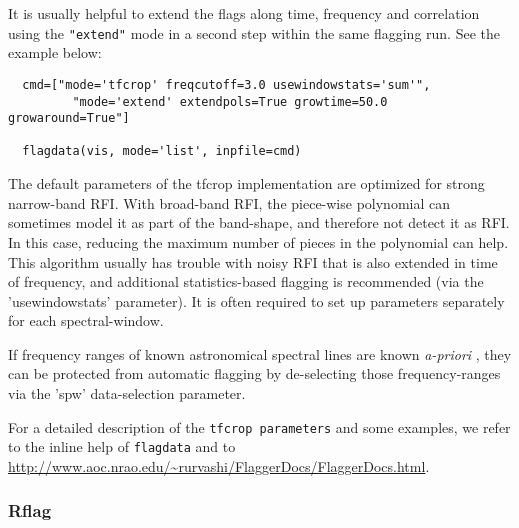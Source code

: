 It is usually helpful to extend the flags along time, frequency and
correlation using the {\tt "extend"}
mode in a second step within the same flagging run. See the example
below:

\small
\begin{verbatim}
  cmd=["mode='tfcrop' freqcutoff=3.0 usewindowstats='sum'", 
         "mode='extend' extendpols=True growtime=50.0 growaround=True"]
                     
  flagdata(vis, mode='list', inpfile=cmd)     
\end{verbatim}
\normalsize


The default parameters of the tfcrop implementation are optimized for
strong narrow-band RFI. With broad-band RFI, the piece-wise polynomial
can sometimes model it as part of the band-shape, and therefore not
detect it as RFI. In this case, reducing the maximum number of pieces
in the polynomial can help. This algorithm usually has trouble with
noisy RFI that is also extended in time of frequency, and additional
statistics-based flagging is recommended (via the 'usewindowstats'
parameter). It is often required to set up parameters separately for
each spectral-window.

If frequency ranges of known astronomical spectral lines are known {\it 
a-priori} , they can be protected from automatic flagging by
de-selecting those frequency-ranges via the 'spw' data-selection
parameter.


For a detailed description of the {\tt tfcrop parameters} and some
examples, we refer to the inline help of {\tt flagdata} and to
\url{http://www.aoc.nrao.edu/~rurvashi/FlaggerDocs/FlaggerDocs.html}.

\subsubsection{Rflag}
\label{section:edit.flagdata.mode.rflag}

